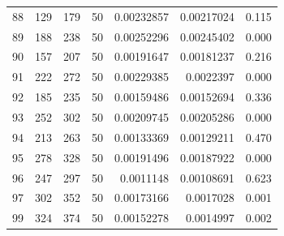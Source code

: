 \begin{tabular}{r r r r r r r}
88 & 129 & 179 & 50 & 0.00232857 & 0.00217024 & 0.115 \\
89 & 188 & 238 & 50 & 0.00252296 & 0.00245402 & 0.000 \\
90 & 157 & 207 & 50 & 0.00191647 & 0.00181237 & 0.216 \\
91 & 222 & 272 & 50 & 0.00229385 & 0.0022397 & 0.000 \\
92 & 185 & 235 & 50 & 0.00159486 & 0.00152694 & 0.336 \\
93 & 252 & 302 & 50 & 0.00209745 & 0.00205286 & 0.000 \\
94 & 213 & 263 & 50 & 0.00133369 & 0.00129211 & 0.470 \\
95 & 278 & 328 & 50 & 0.00191496 & 0.00187922 & 0.000 \\
96 & 247 & 297 & 50 & 0.0011148 & 0.00108691 & 0.623 \\
97 & 302 & 352 & 50 & 0.00173166 & 0.0017028 & 0.001 \\
99 & 324 & 374 & 50 & 0.00152278 & 0.0014997 & 0.002 \\
\bottomrule
\end{tabular}
